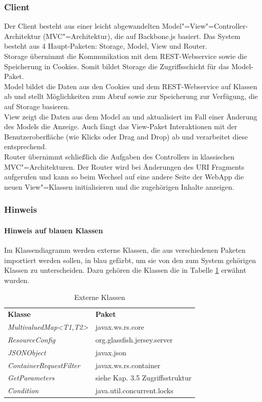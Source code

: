 \subsubsection{Client}
Der Client besteht aus einer leicht abgewandelten Model"=View"=Controller-Architektur (MVC"=Architektur), die auf Backbone.js \cite{backbone} basiert.
Das System besteht aus 4 Haupt-Paketen: Storage, Model, View und Router.\\
Storage übernimmt die Kommunikation mit dem REST-Webservice sowie die Speicherung in Cookies. Somit bildet Storage die Zugriffsschicht für das Model-Paket. \\
Model bildet die Daten aus den Cookies und dem REST-Webservice auf Klassen ab und stellt Möglichkeiten zum Abruf sowie zur Speicherung zur Verfügung, die auf Storage basieren.\\
View zeigt die Daten aus dem Model an und aktualisiert im Fall einer Änderung des Models die Anzeige. Auch fängt das View-Paket Interaktionen mit der Benutzeroberfläche (wie Klicks oder Drag and Drop) ab und verarbeitet diese entsprechend.\\
Router übernimmt schließlich die Aufgaben des Controllers in klassischen MVC"=Architekturen. Der Router wird bei Änderungen des URI Fragments aufgerufen und kann so beim Wechsel auf eine andere Seite der WebApp die neuen View"=Klassen initialisieren und die zugehörigen Inhalte anzeigen.

\subsubsection{Hinweis}  %
\paragraph{Hinweis auf blauen Klassen}Im Klassendiagramm werden externe Klassen, die aus verschiedenen Paketen importiert werden sollen, in blau gefärbt, um sie von den zum System gehörigen Klassen zu unterscheiden. Dazu gehören die Klassen die in Tabelle \ref{tab:extern_classes} erwähnt wurden.
\begin{table}
	\begin{tabular}{@{} | p{} | p{} | @{}} 
		\hline
		\textbf{Klasse} & \textbf{Paket}\\ \hhline{|=|=|}
		\textit{MultivaluedMap<T1,T2>} & javax.ws.rs.core \\ \hline
		\textit{ResourceConfig} & org.glassfish.jersey.server \\ \hline
		\textit{JSONObject} & javax.json \\ \hline
		\textit{ContainerRequestFilter} & javax.ws.rs.container \\ \hline
		\textit{GetParameters} & siehe Kap. 3.5 Zugriffsstruktur \\
		\hline
		\textit{Condition} & java.util.concurrent.locks \\
		\hline
	\end{tabular}
	\caption{Externe Klassen}
	\label{tab:extern_classes}
\end{table}